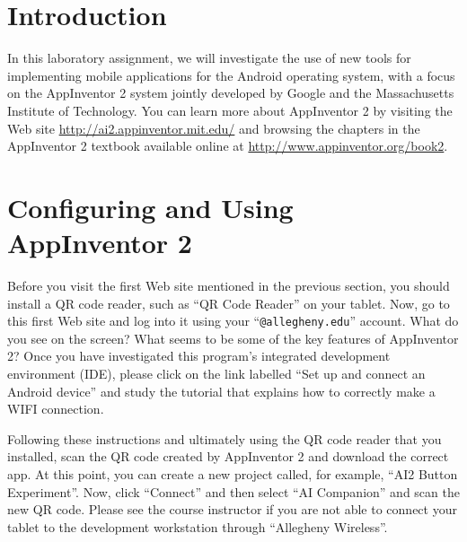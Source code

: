 


\usepackage[compact]{titlesec}



\vspace*{-.1in}
\section*{Introduction}

In this laboratory assignment, we will investigate the use of new tools for implementing mobile applications for the
Android operating system, with a focus on the AppInventor 2 system jointly developed by Google and the Massachusetts
Institute of Technology.  You can learn more about AppInventor 2 by visiting the Web site
\url{http://ai2.appinventor.mit.edu/} and browsing the chapters in the AppInventor 2 textbook available online at
\url{http://www.appinventor.org/book2}.

\section*{Configuring and Using AppInventor 2}

Before you visit the first Web site mentioned in the previous section, you should install a QR code reader, such as ``QR
Code Reader'' on your tablet. Now, go to this first Web site and log into it using your ``{\tt @allegheny.edu}''
account. What do you see on the screen? What seems to be some of the key features of AppInventor 2? Once you have
investigated this program's integrated development environment (IDE), please click on the link labelled ``Set up and
connect an Android device'' and study the tutorial that explains how to correctly make a WIFI connection. 

Following these instructions and ultimately using the QR code reader that you installed, scan the QR code created by
AppInventor 2 and download the correct app. At this point, you can create a new project called, for
example, ``AI2 Button Experiment''. Now, click ``Connect'' and then select ``AI Companion'' and scan the new QR code.
Please see the course instructor if you are not able to connect your tablet
to the development workstation through ``Allegheny Wireless''. 

